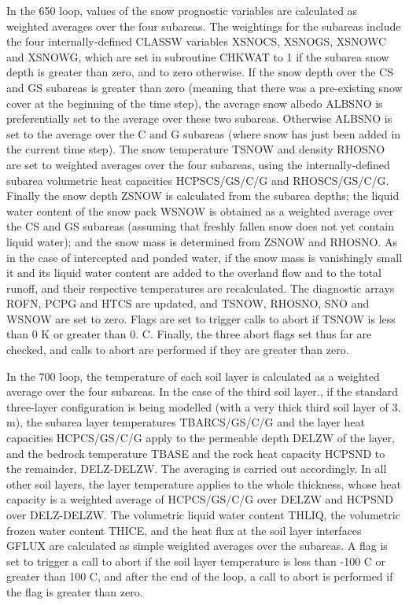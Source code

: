 In the 650 loop, values of the snow prognostic variables are calculated as weighted averages over the four subareas. The weightings for the subareas include the four internally-\/defined C\+L\+A\+S\+S\+W variables X\+S\+N\+O\+C\+S, X\+S\+N\+O\+G\+S, X\+S\+N\+O\+W\+C and X\+S\+N\+O\+W\+G, which are set in subroutine C\+H\+K\+W\+A\+T to 1 if the subarea snow depth is greater than zero, and to zero otherwise. If the snow depth over the C\+S and G\+S subareas is greater than zero (meaning that there was a pre-\/existing snow cover at the beginning of the time step), the average snow albedo A\+L\+B\+S\+N\+O is preferentially set to the average over these two subareas. Otherwise A\+L\+B\+S\+N\+O is set to the average over the C and G subareas (where snow has just been added in the current time step). The snow temperature T\+S\+N\+O\+W and density R\+H\+O\+S\+N\+O are set to weighted averages over the four subareas, using the internally-\/defined subarea volumetric heat capacities H\+C\+P\+S\+C\+S/\+G\+S/\+C/\+G and R\+H\+O\+S\+C\+S/\+G\+S/\+C/\+G. Finally the snow depth Z\+S\+N\+O\+W is calculated from the subarea depths; the liquid water content of the snow pack W\+S\+N\+O\+W is obtained as a weighted average over the C\+S and G\+S subareas (assuming that freshly fallen snow does not yet contain liquid water); and the snow mass is determined from Z\+S\+N\+O\+W and R\+H\+O\+S\+N\+O. As in the case of intercepted and ponded water, if the snow mass is vanishingly small it and its liquid water content are added to the overland flow and to the total runoff, and their respective temperatures are recalculated. The diagnostic arrays R\+O\+F\+N, P\+C\+P\+G and H\+T\+C\+S are updated, and T\+S\+N\+O\+W, R\+H\+O\+S\+N\+O, S\+N\+O and W\+S\+N\+O\+W are set to zero. Flags are set to trigger calls to abort if T\+S\+N\+O\+W is less than 0 K or greater than 0. C. Finally, the three abort flags set thus far are checked, and calls to abort are performed if they are greater than zero.

In the 700 loop, the temperature of each soil layer is calculated as a weighted average over the four subareas. In the case of the third soil layer., if the standard three-\/layer configuration is being modelled (with a very thick third soil layer of 3. m), the subarea layer temperatures T\+B\+A\+R\+C\+S/\+G\+S/\+C/\+G and the layer heat capacities H\+C\+P\+C\+S/\+G\+S/\+C/\+G apply to the permeable depth D\+E\+L\+Z\+W of the layer, and the bedrock temperature T\+B\+A\+S\+E and the rock heat capacity H\+C\+P\+S\+N\+D to the remainder, D\+E\+L\+Z-\/\+D\+E\+L\+Z\+W. The averaging is carried out accordingly. In all other soil layers, the layer temperature applies to the whole thickness, whose heat capacity is a weighted average of H\+C\+P\+C\+S/\+G\+S/\+C/\+G over D\+E\+L\+Z\+W and H\+C\+P\+S\+N\+D over D\+E\+L\+Z-\/\+D\+E\+L\+Z\+W. The volumetric liquid water content T\+H\+L\+I\+Q, the volumetric frozen water content T\+H\+I\+C\+E, and the heat flux at the soil layer interfaces G\+F\+L\+U\+X are calculated as simple weighted averages over the subareas. A flag is set to trigger a call to abort if the soil layer temperature is less than -\/100 C or greater than 100 C, and after the end of the loop, a call to abort is performed if the flag is greater than zero.


